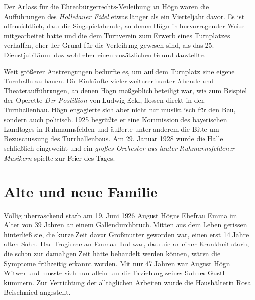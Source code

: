 \documentclass{book}
\newcommand{\zitat}[1]{\textit{#1}}
\begin{document}
Der Anlass für die Ehrenbürgerrechts-Verleihung an Högn waren die
Aufführungen des \textit{Holledauer Fidel} etwas länger als ein
Vierteljahr davor. Es ist offensichtlich, dass die Singspielabende, an
denen Högn in hervorragender Weise mitgearbeitet hatte und die dem
Turnverein zum Erwerb eines Turnplatzes verhalfen, eher der Grund für
die Verleihung gewesen sind, als das 25. Dienstjubiläum, das wohl eher
einen zusätzlichen Grund darstellte.




Weit größerer Anstrengungen bedurfte es, um auf dem Turnplatz eine
eigene Turnhalle zu bauen. Die Einkünfte vieler weiterer bunter Abende
und Theateraufführungen, an denen Högn maßgeblich beteiligt war, wie
zum Beispiel der Operette \textit{Der Postillion} von Ludwig Eckl,
flossen direkt in den Turnhallenbau. Högn engagierte sich aber nicht
nur musikalisch für den Bau, sondern auch politisch. 1925 begrüßte er
eine Kommission des bayerischen Landtages in Ruhmannsfelden und äußerte
unter anderem die Bitte um Bezuschussung des Turnhallenbaus. Am 29.
Januar 1928 wurde die Halle schließlich eingeweiht und ein
\zitat{großes Orchester aus lauter Ruhmannsfeldener Musikern
}spielte zur Feier des Tages.


\section{Alte und neue Familie}

Völlig überraschend starb am 19. Juni 1926 August Högns Ehefrau Emma im
Alter von 39 Jahren an einem Gallendurchbruch. Mitten aus dem Leben
gerissen hinterließ sie, die kurze Zeit davor Großmutter geworden
war, einen erst 14 Jahre alten Sohn. Das Tragische an Emmas Tod war,
dass sie an einer Krankheit starb, die schon zur damaligen Zeit hätte
behandelt werden können, wären die Symptome frühzeitig erkannt worden.
Mit nur 47 Jahren war August Högn Witwer und musste sich nun allein um
die Erziehung seines Sohnes Gustl kümmern. Zur Verrichtung der
alltäglichen Arbeiten wurde die Haushälterin Rosa Beischmied
angestellt.
\end{document}
